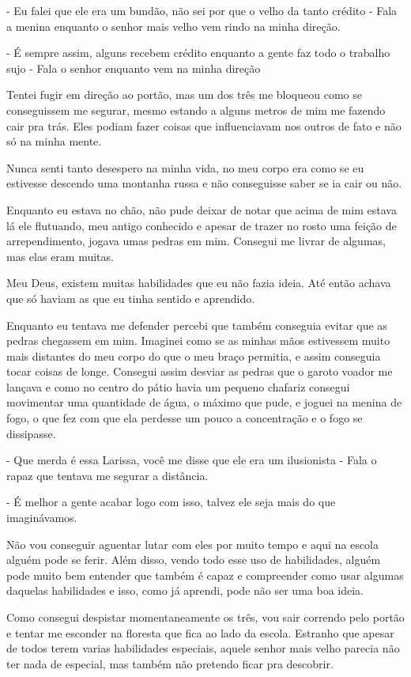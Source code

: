 - Eu falei que ele era um bundão, não sei por que o velho da tanto crédito - Fala a menina enquanto o senhor mais velho vem rindo na minha direção.

- É sempre assim, alguns recebem crédito enquanto a gente faz todo o trabalho sujo - Fala o senhor enquanto vem na minha direção

Tentei fugir em direção ao portão, mas um dos três me bloqueou como se conseguissem me segurar, mesmo estando a alguns metros de mim me fazendo cair pra trás. Eles podiam fazer coisas que influenciavam nos outros de fato e não só na minha mente.

Nunca senti tanto desespero na minha vida, no meu corpo era como se eu estivesse descendo uma montanha russa e não conseguisse saber se ia cair ou não. 

Enquanto eu estava no chão, não pude deixar de notar que acima de mim estava lá ele flutuando, meu antigo conhecido e apesar de trazer no rosto uma feição de arrependimento, jogava umas pedras em mim. Consegui me livrar de algumas, mas elas eram muitas.

Meu Deus, existem muitas habilidades que eu não fazia ideia. Até então achava que só haviam as que eu tinha sentido e aprendido. 

Enquanto eu tentava me defender percebi que também conseguia evitar que as pedras chegassem em mim. Imaginei como se as minhas mãos estivessem muito mais distantes do meu corpo do que o meu braço permitia, e assim conseguia tocar coisas de longe. Consegui assim desviar as pedras que o garoto voador me lançava e como no centro do pátio havia um pequeno chafariz consegui movimentar uma quantidade de água, o máximo que pude, e joguei na menina de fogo, o que fez com que ela perdesse um pouco a concentração e o fogo se dissipasse.

- Que merda é essa Larissa, você me disse que ele era um ilusionista - Fala o rapaz que tentava me segurar a distância.

- É melhor a gente acabar logo com isso, talvez ele seja mais do que imaginávamos.

Não vou conseguir aguentar lutar com eles por muito tempo e aqui na escola alguém pode se ferir. Além disso, vendo todo esse uso de habilidades, alguém pode muito bem entender que também é capaz e compreender como usar algumas daquelas habilidades e isso, como já aprendi, pode não ser uma boa ideia.

Como consegui despistar momentaneamente os três, vou sair correndo pelo portão e tentar me esconder na floresta que fica ao lado da escola. Estranho que apesar de todos terem varias habilidades especiais, aquele senhor mais velho parecia não ter nada de especial, mas também não pretendo ficar pra descobrir.

